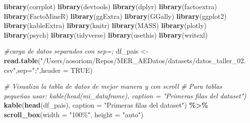 \documentclass[
]{article}
\newenvironment{Shaded}{\begin{snugshade}}{\end{snugshade}}
\newcommand{\AttributeTok}[1]{\textcolor[rgb]{0.13,0.29,0.53}{#1}}
\newcommand{\CommentTok}[1]{\textcolor[rgb]{0.56,0.35,0.01}{\textit{#1}}}
\newcommand{\ConstantTok}[1]{\textcolor[rgb]{0.56,0.35,0.01}{#1}}
\newcommand{\FunctionTok}[1]{\textcolor[rgb]{0.13,0.29,0.53}{\textbf{#1}}}
\newcommand{\NormalTok}[1]{#1}
\newcommand{\OtherTok}[1]{\textcolor[rgb]{0.56,0.35,0.01}{#1}}
\newcommand{\SpecialCharTok}[1]{\textcolor[rgb]{0.81,0.36,0.00}{\textbf{#1}}}
\newcommand{\StringTok}[1]{\textcolor[rgb]{0.31,0.60,0.02}{#1}}
\begin{document}
\begin{Shaded}
\begin{Highlighting}[]
\FunctionTok{library}\NormalTok{(corrplot)}
\FunctionTok{library}\NormalTok{(devtools)}
\FunctionTok{library}\NormalTok{(dplyr)}
\FunctionTok{library}\NormalTok{(factoextra)}
\FunctionTok{library}\NormalTok{(FactoMineR)}
\FunctionTok{library}\NormalTok{(ggExtra)}
\FunctionTok{library}\NormalTok{(GGally)}
\FunctionTok{library}\NormalTok{(ggplot2)}
\FunctionTok{library}\NormalTok{(kableExtra)}
\FunctionTok{library}\NormalTok{(knitr)}
\FunctionTok{library}\NormalTok{(MASS)}
\FunctionTok{library}\NormalTok{(plotly)}
\FunctionTok{library}\NormalTok{(psych)}
\FunctionTok{library}\NormalTok{(tidyverse)}
\FunctionTok{library}\NormalTok{(usethis)}
\FunctionTok{library}\NormalTok{(writexl)}

\CommentTok{\#carga de datos separados con sep=; }
\NormalTok{df\_pais }\OtherTok{\textless{}{-}} \FunctionTok{read.table}\NormalTok{(}\StringTok{"/Users/aosoriom/Repos/MER\_AEDatos/datasets/datos\_taller\_02.csv"}\NormalTok{,}\AttributeTok{sep=}\StringTok{";"}\NormalTok{,}\AttributeTok{header =} \ConstantTok{TRUE}\NormalTok{)}

\CommentTok{\# Visualiza la tabla de datos de mejor manera y con scroll}
\CommentTok{\# Para tablas pequeñas usar: kable(head(mi\_dataframe), caption = "Primeras filas del dataset")}
\FunctionTok{kable}\NormalTok{(}\FunctionTok{head}\NormalTok{(df\_pais), }\AttributeTok{caption =} \StringTok{"Primeras filas del dataset"}\NormalTok{) }\SpecialCharTok{\%\textgreater{}\%}
  \FunctionTok{scroll\_box}\NormalTok{(}\AttributeTok{width =} \StringTok{"100\%"}\NormalTok{, }\AttributeTok{height =} \StringTok{"auto"}\NormalTok{)}
\end{Highlighting}
\end{Shaded}
\end{document}
